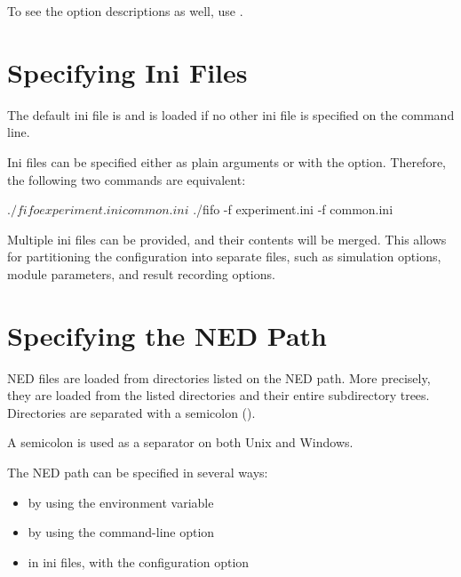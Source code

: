 To see the option descriptions as well, use .



\section{Specifying Ini Files}
\label{sec:run-sim:specifying-ini-files}

The default ini file is  and is loaded if no other ini
file is specified on the command line.

Ini files can be specified either as plain arguments or with the 
option. Therefore, the following two commands are equivalent:

\begin{commandline}
$ ./fifo experiment.ini common.ini
$ ./fifo -f experiment.ini -f common.ini
\end{commandline}

Multiple ini files can be provided, and their contents will be merged. This
allows for partitioning the configuration into separate files, such as
simulation options, module parameters, and result recording options.


\section{Specifying the NED Path}
\label{sec:run-sim:specifying-ned-path}

NED files are loaded from directories listed on the NED path. More precisely,
they are loaded from the listed directories and their entire subdirectory trees.
Directories are separated with a semicolon (\ttt{;}).

\begin{note}
A semicolon is used as a separator on both Unix and Windows.
\end{note}

The NED path can be specified in several ways:
\begin{itemize}
  \item by using the  environment variable
  \item by using the  command-line option
  \item in ini files, with the  configuration option
\end{itemize}

